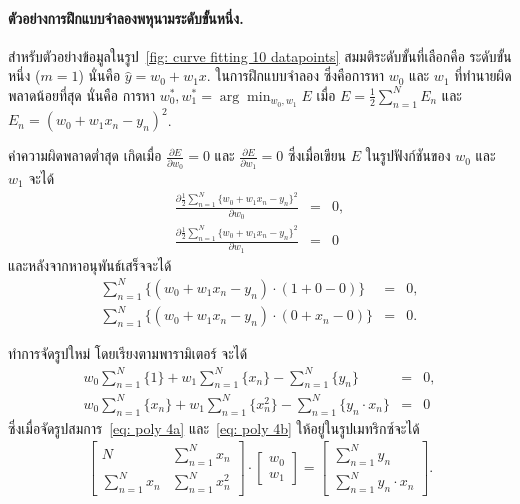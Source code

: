 \paragraph{ตัวอย่างการฝึกแบบจำลองพหุนามระดับขั้นหนึ่ง.}
สำหรับตัวอย่างข้อมูลในรูป~\ref{fig: curve fitting 10 datapoints}
สมมติระดับขั้นที่เลือกคือ ระดับขั้นหนึ่ง ($m=1$)
นั่นคือ $\hat{y} = w_0 + w_1 x$.
ในการฝึกแบบจำลอง ซึ่งคือการหา $w_0$ และ $w_1$ ที่ทำนายผิดพลาดน้อยที่สุด
นั่นคือ การหา $w_0^\ast, w_1^\ast = \arg\min_{w_0, w_1} E$
เมื่อ $E = \frac{1}{2} \sum_{n=1}^N  E_n$
และ
$E_n =  (w_0 + w_1 x_n - y_n)^2$.

ค่าความผิดพลาดต่ำสุด เกิดเมื่อ $\frac{\partial E}{\partial w_0} = 0$ 
และ
$\frac{\partial E}{\partial w_1} = 0$ ซึ่งเมื่อเขียน $E$ ในรูปฟังก์ชันของ $w_0$ และ $w_1$ จะได้
\begin{eqnarray}
\frac{\partial \frac{1}{2} \sum_{n=1}^N \{ w_0 + w_1 x_n - y_n \}^2}{\partial w_0} &=& 0, 
\label{eq: polynomial derivatives 2a}
\\
\frac{\partial \frac{1}{2} \sum_{n=1}^N \{ w_0 + w_1 x_n - y_n \}^2}{\partial w_1} &=& 0
\label{eq: polynomial derivatives 2b}
\end{eqnarray}
และหลังจากหาอนุพันธ์เสร็จจะได้
\begin{eqnarray}
\sum_{n=1}^N \{ (w_0 + w_1 x_n - y_n) \cdot (1 + 0 - 0) \} &=& 0, 
\label{eq: polynomial derivatives 3a} \\
\sum_{n=1}^N \{ (w_0 + w_1 x_n - y_n) \cdot (0 + x_n - 0) \} &=& 0.
\label{eq: polynomial derivatives 3b}
\end{eqnarray}

ทำการจัดรูปใหม่ โดยเรียงตามพารามิเตอร์ จะได้
\begin{eqnarray}
%
w_0 \sum_{n=1}^N \{ 1 \} + w_1 \sum_{n=1}^N \{ x_n \} - \sum_{n=1}^N \{ y_n \} &=& 0, 
\label{eq: poly 4a} \\
w_0 \sum_{n=1}^N \{ x_n \} + w_1 \sum_{n=1}^N \{ x_n^2 \} - \sum_{n=1}^N \{ y_n \cdot x_n \} &=& 0 
\label{eq: poly 4b}
\end{eqnarray}
ซึ่งเมื่อจัดรูปสมการ~\ref{eq: poly 4a} และ~\ref{eq: poly 4b} ให้อยู่ในรูปเมทริกซ์จะได้
\begin{eqnarray}
%
\left[ 
\begin{matrix}
N & \sum_{n=1}^N x_n \\
\sum_{n=1}^N x_n & \sum_{n=1}^N x_n^2
\end{matrix}
\right] \cdot 
\left[ 
\begin{matrix}
w_0 \\
w_1
\end{matrix}
\right]
=
\left[ 
\begin{matrix}
\sum_{n=1}^N y_n \\
\sum_{n=1}^N y_n \cdot x_n
\end{matrix}
\right].
\label{eq: polynomial M1}
\end{eqnarray}

